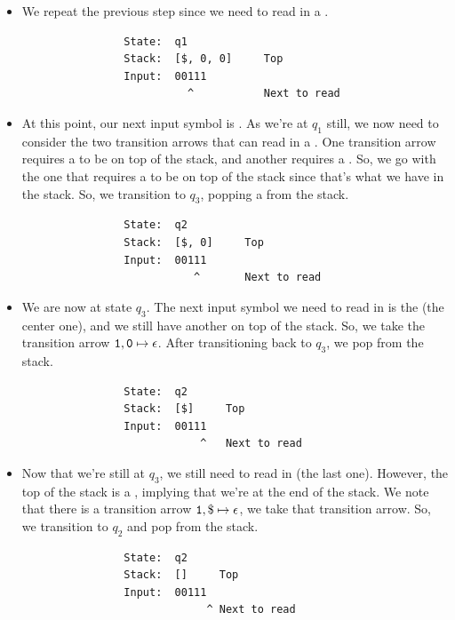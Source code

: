 \documentclass[letterpaper]{article}
\begin{document}
\begin{enumerate}
\begin{mdframed}[]
\begin{itemize}
            \item We repeat the previous step since we need to read in a . 
            \begin{verbatim}
                State:  q1
                Stack:  [$, 0, 0]     Top 
                Input:  00111
                          ^           Next to read
            \end{verbatim}

            \item At this point, our next input symbol is . As we're at $q_1$ still, we now need to consider the two transition arrows that can read in a . One transition arrow requires a  to be on top of the stack, and another requires a \code{\$}. So, we go with the one that requires a  to be on top of the stack since that's what we have in the stack. So, we transition to $q_3$, popping a  from the stack. 
            \begin{verbatim}
                State:  q2
                Stack:  [$, 0]     Top 
                Input:  00111
                           ^       Next to read
            \end{verbatim}
            
            \item We are now at state $q_3$. The next input symbol we need to read in is the  (the center one), and we still have another  on top of the stack. So, we take the transition arrow $\texttt{1}, \texttt{0} \mapsto \epsilon$. After transitioning back to $q_3$, we pop  from the stack. 
            \begin{verbatim}
                State:  q2
                Stack:  [$]     Top 
                Input:  00111
                            ^   Next to read
            \end{verbatim}

            \item Now that we're still at $q_3$, we still need to read in  (the last one). However, the top of the stack is a \code{\$}, implying that we're at the end of the stack. We note that there is a transition arrow $\texttt{1}, \$ \mapsto \epsilon$, we take that transition arrow. So, we transition to $q_2$ and pop \code{\$} from the stack. 
            \begin{verbatim}
                State:  q2
                Stack:  []     Top 
                Input:  00111
                             ^ Next to read
            \end{verbatim}


\end{itemize}
\end{mdframed}
\end{enumerate}
\end{document}
